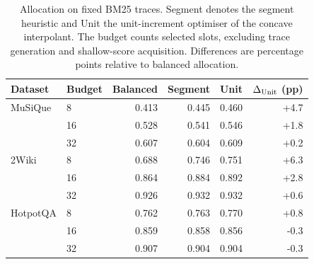 \begin{table}[H]
\centering
\small
\caption{Allocation on fixed BM25 traces. Segment denotes the segment heuristic and Unit the unit-increment optimiser of the concave interpolant. The budget counts selected slots, excluding trace generation and shallow-score acquisition. Differences are percentage points relative to balanced allocation.}
\label{tab:ch5-bm25-allocation}
\begin{tabular}{llrrrr}
\hline
Dataset & Budget & Balanced & Segment & Unit & $\Delta_{\rm Unit}$ (pp) \\
\hline
MuSiQue & 8 & 0.413 & 0.445 & 0.460 & +4.7 \\
 & 16 & 0.528 & 0.541 & 0.546 & +1.8 \\
 & 32 & 0.607 & 0.604 & 0.609 & +0.2 \\
2Wiki & 8 & 0.688 & 0.746 & 0.751 & +6.3 \\
 & 16 & 0.864 & 0.884 & 0.892 & +2.8 \\
 & 32 & 0.926 & 0.932 & 0.932 & +0.6 \\
HotpotQA & 8 & 0.762 & 0.763 & 0.770 & +0.8 \\
 & 16 & 0.859 & 0.858 & 0.856 & -0.3 \\
 & 32 & 0.907 & 0.904 & 0.904 & -0.3 \\
\hline
\end{tabular}
\end{table}
